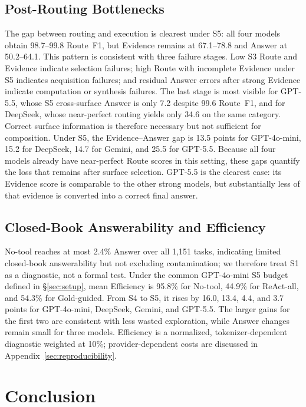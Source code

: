 \documentclass[11pt]{article}
\begin{document}
\subsection{Post-Routing Bottlenecks}
\label{sec:failures}
The gap between routing and execution is clearest under S5: all four models
obtain 98.7--99.8 Route~F1, but Evidence remains at 67.1--78.8 and Answer at
50.2--64.1. This pattern is consistent with three failure stages. Low S3 Route
and Evidence indicate selection failures; high Route with incomplete Evidence
under S5 indicates acquisition failures; and residual Answer errors after
strong Evidence indicate computation or synthesis failures. The last stage is most
visible for GPT-5.5, whose S5 cross-surface Answer is only 7.2 despite 99.6
Route~F1, and for DeepSeek, whose near-perfect routing yields only 34.6 on the
same category. Correct surface information is therefore necessary but not
sufficient for composition.
Under S5, the Evidence--Answer gap is 13.5 points for GPT-4o-mini, 15.2 for
DeepSeek, 14.7 for Gemini, and 25.5 for GPT-5.5. Because all four models already
have near-perfect Route scores in this setting, these gaps quantify the loss
that remains after surface selection. GPT-5.5 is the clearest case:
its Evidence score is comparable to the other strong models, but substantially
less of that evidence is converted into a correct final answer.

\subsection{Closed-Book Answerability and Efficiency}
\label{sec:closedbook}
No-tool reaches at most 2.4\% Answer over all 1{,}151 tasks, indicating limited
closed-book answerability but not excluding contamination; we therefore treat
S1 as a diagnostic, not a formal test. Under the common GPT-4o-mini S5 budget
defined in \S\ref{sec:setup}, mean Efficiency is 95.8\% for No-tool, 44.9\% for
ReAct-all, and 54.3\% for Gold-guided. From S4 to S5, it rises by 16.0, 13.4,
4.4, and 3.7 points for GPT-4o-mini, DeepSeek, Gemini, and GPT-5.5. The larger
gains for the first two are consistent with less wasted exploration, while
Answer changes remain small for three models. Efficiency is a normalized, tokenizer-dependent diagnostic weighted
at 10\%; provider-dependent costs are discussed in
Appendix~\ref{sec:reproducibility}.

\section{Conclusion}
\label{sec:conclusion}
\end{document}
